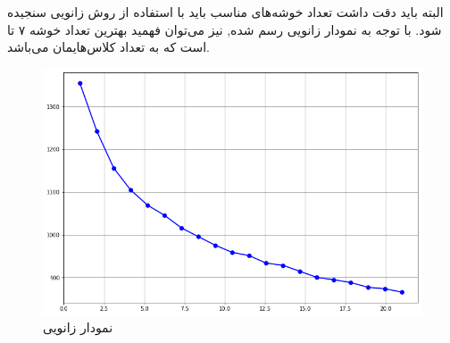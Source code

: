 \documentclass{article}
\begin{document}
البته باید دقت داشت تعداد خوشه‌های مناسب باید با استفاده از روش زانویی سنجیده شود. با توجه به نمودار زانویی رسم شده, نیز می‌توان فهمید بهترین تعداد خوشه ۷ تا است که به تعداد کلاس‌هایمان می‌باشد.
\begin{figure}[h]
	\centering
	\includegraphics[width=0.7\linewidth]{Photo/38}
	\caption[نمودار زانویی \ ]{نمودار زانویی }
	\label{fig:38}
\end{figure}
\end{document}
